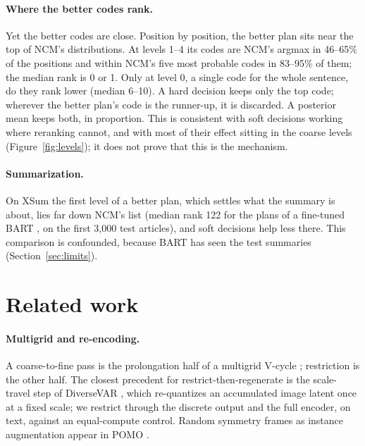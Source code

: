 \documentclass[11pt]{article}
\begin{document}
\paragraph{Where the better codes rank.} Yet the better codes are close. Position by position, the better plan sits near the top of NCM's
distributions. At levels 1--4 its codes are NCM's argmax in 46--65\% of the positions and within NCM's five most
probable codes in 83--95\% of them; the median rank is 0 or 1. Only at level 0, a single code for the whole sentence,
do they rank lower (median 6--10). A hard decision keeps only the top code; wherever the better plan's code is the runner-up, it is
discarded. A posterior mean keeps both, in proportion. This is consistent with soft decisions working where
reranking cannot, and with most of their effect sitting in the coarse levels (Figure~\ref{fig:levels}); it does not
prove that this is the mechanism.

\paragraph{Summarization.} On XSum the first level of a better plan, which settles what the summary is about, lies
far down NCM's list (median rank 122 for the plans of a fine-tuned BART \citep{lewis2020bart}, on the first 3,000 test articles), and soft decisions
help less there. This comparison is confounded, because BART has seen the test summaries (Section~\ref{sec:limits}).

\section{Related work}
\label{sec:related}

\paragraph{Multigrid and re-encoding.} A coarse-to-fine pass is the prolongation half of a multigrid V-cycle
\citep{brandt1977multigrid,briggs2000multigrid}; restriction is the other half. The closest precedent for
restrict-then-regenerate is the scale-travel step of DiverseVAR \citep{park2025diversevar}, which re-quantizes an
accumulated image latent once at a fixed scale; we restrict through the discrete output and the full encoder, on
text, against an equal-compute control. Random symmetry frames as instance augmentation appear in POMO
\citep{kwon2020pomo}.
\end{document}
